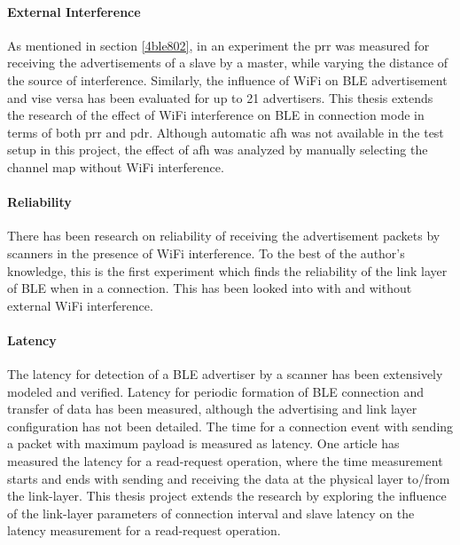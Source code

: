 \paragraph{External Interference}
As mentioned in section \ref{4ble802}, in an experiment\cite{Siekkinen2012} the \gls{prr} was measured for receiving the advertisements of a slave by a master, while varying the distance of the source of interference. Similarly, the influence of WiFi on BLE advertisement and vise versa has been evaluated for up to 21 advertisers\cite{Wyffels}. This thesis extends the research of the effect of WiFi interference on BLE in connection mode in terms of both \gls{prr} and \gls{pdr}. Although automatic \gls{afh} was not available in the test setup in this project, the effect of \gls{afh} was analyzed by manually selecting the channel map without WiFi interference. 

\paragraph{Reliability} There has been research on reliability of receiving the advertisement packets by scanners in the presence of WiFi interference\cite{Wyffels}\cite{Siekkinen2012}. To the best of the author's knowledge, this is the first experiment which finds the reliability of the link layer of BLE when in a connection. This has been looked into with and without external WiFi interference.

\paragraph{Latency}
The latency for detection of a BLE advertiser by a scanner has been extensively modeled and verified\cite{Kindt2014}\cite{Liu2012}. Latency for periodic formation of BLE connection and transfer of data has been measured\cite{Dementyev2013}, although the advertising and link layer configuration has not been detailed. The time for a connection event with sending a packet with maximum payload is measured as latency\cite{Gomez2012}. One article has measured the latency for a read-request operation, where the time measurement starts and ends with sending and receiving the data at the physical layer to/from the link-layer\cite{Mikhaylov2013}. This thesis project extends the research by exploring the influence of the link-layer parameters of connection interval and slave latency on the latency measurement for a read-request operation.

